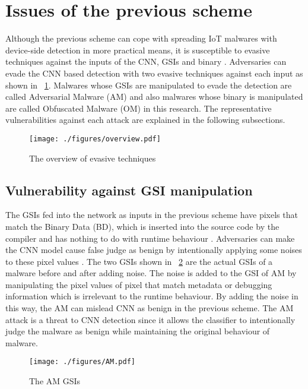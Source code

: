 \section{Issues of the previous scheme } 
Although the previous scheme can cope with spreading IoT malwares with device-side detection in more practical means, it is susceptible to evasive techniques against the inputs of the CNN, GSIs and binary \cite{attack1, attack2}.
Adversaries can evade the CNN based detection with two evasive techniques against each input as shown in \figurename~\ref{fig:ov}.
Malwares whose GSIs are manipulated to evade the detection are called Adversarial Malware (AM) and also malwares whose binary is manipulated are called Obfuscated Malware (OM) in this research.  
The representative vulnerabilities against each attack are explained in the following subsections.

\begin{figure}[p]
 \centering
 \hspace{-55pt}
 \texttt{[image: ./figures/overview.pdf]}
 \caption{The overview of evasive techniques} 
 \label{fig:ov}
\end{figure}
\afterpage{\clearpage}
\newpage

\subsection{Vulnerability against GSI manipulation}
The GSIs fed into the network as inputs in the previous scheme have pixels that match the Binary Data (BD), which is inserted into the source code by the compiler and has nothing to do with runtime behaviour \cite{am}.
Adversaries can make the CNN model cause false judge as benign by intentionally applying some noises to these pixel values \cite{am}.
The two GSIs shown in \figurename~\ref{fig:amGSI} are the actual GSIs of a malware before and after adding noise.
The noise is added to the GSI of AM by manipulating the pixel values of pixel that match metadata or debugging information which is irrelevant to the runtime behaviour.
By adding the noise in this way, the AM can mislead CNN as benign in the previous scheme.
The AM attack is a threat to CNN detection since it allows the classifier to intentionally judge the malware as benign while maintaining the original behaviour of malware.

\begin{figure}[p]
 \centering
 \hspace{-55pt}
 \texttt{[image: ./figures/AM.pdf]}
 \caption{The AM GSIs} 
 \label{fig:amGSI}
\end{figure}
\afterpage{\clearpage}
\newpage
